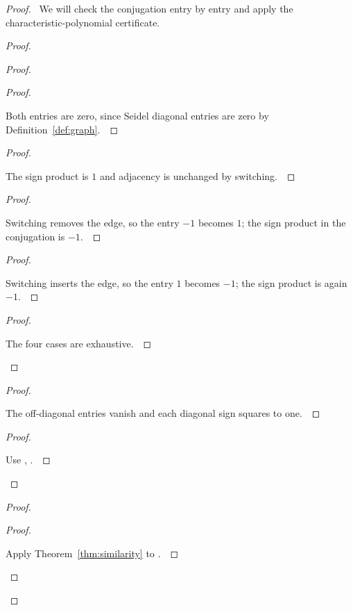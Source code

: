 \documentclass[11pt]{amsart}
\let\qed\relax
\theoremstyle{definition}
\begin{document}
\begin{proof}
\pfsketch\ We will check the conjugation entry by entry and apply the characteristic-polynomial certificate.
\begin{proof}
\begin{proof}
\begin{proof}
\pf\ \raggedright Both entries are zero, since Seidel diagonal entries are zero by Definition~\ref{def:graph}.~\qed
\end{proof}
\begin{proof}
\pf\ \raggedright The sign product is $1$ and adjacency is unchanged by switching.~\qed
\end{proof}
\begin{proof}
\pf\ \raggedright Switching removes the edge, so the entry $-1$ becomes $1$; the sign product in the conjugation is $-1$.~\qed
\end{proof}
\begin{proof}
\pf\ \raggedright Switching inserts the edge, so the entry $1$ becomes $-1$; the sign product is again $-1$.~\qed
\end{proof}
\qedstep
\begin{proof}
\pf\ \raggedright The four cases are exhaustive.~\qed
\end{proof}
\end{proof}
\begin{proof}
\pf\ \raggedright The off-diagonal entries vanish and each diagonal sign squares to one.~\qed
\end{proof}
\qedstep
\begin{proof}
\pf\ \raggedright Use , .~\qed
\end{proof}
\end{proof}
\begin{proof}
\begin{proof}
\pf\ \raggedright Apply Theorem~\ref{thm:similarity} to .~\qed

\end{proof}
\end{proof}
\end{proof}
\end{document}
